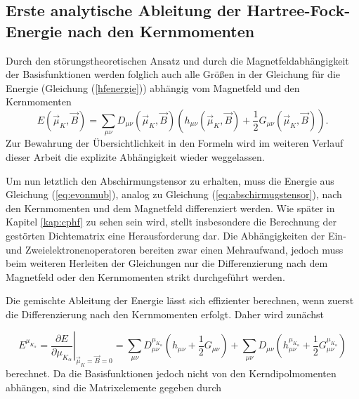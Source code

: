 \subsection{Erste analytische Ableitung der Hartree-Fock-Energie nach den Kernmomenten}

  	Durch den störungstheoretischen Ansatz und durch die Magnetfeldabhängigkeit der Basisfunktionen werden folglich auch alle Größen in der Gleichung für die Energie (Gleichung (\ref{hfenergie})) abhängig vom Magnetfeld und den Kernmomenten
  	\begin{equation}\label{eq:evonmub}
  	  E(\vec{\mu}_K,\vec{B})=\sum_{\mu\nu}D_{\mu\nu}(\vec{\mu}_K,\vec{B})(h_{\mu\nu}(\vec{\mu}_K,\vec{B})+\frac{1}{2}G_{\mu\nu}(\vec{\mu}_K,\vec{B})).
	\end{equation}  	 
  	\textcolor{myred}{Zur Bewahrung der Übersichtlichkeit in den Formeln wird im weiteren Verlauf dieser Arbeit die explizite Abhängigkeit wieder weggelassen.}
  	
  	Um nun letztlich den Abschirmungstensor zu erhalten, muss die Energie aus Gleichung (\ref{eq:evonmub}), analog zu Gleichung (\ref{eq:abschirmugstensor}), nach den Kernmomenten und dem Magnetfeld differenziert werden. Wie später in Kapitel \ref{kap:cphf} zu sehen sein wird, stellt insbesondere die Berechnung der gestörten Dichtematrix eine Herausforderung dar. Die Abhängigkeiten der Ein- und Zweielektronenoperatoren bereiten zwar einen Mehraufwand, jedoch muss beim weiteren Herleiten der Gleichungen nur die Differenzierung nach dem Magnetfeld oder den Kernmomenten strikt durchgeführt werden.
  	 
  	Die gemischte Ableitung der Energie lässt sich effizienter berechnen, wenn zuerst die Differenzierung nach den Kernmomenten erfolgt\supercite{baron1991}. Daher wird zunächst
  	
  	\begin{equation}\label{eq:enachmu}
  	  E^{\mu_{K_\alpha}}=\left.\frac{\partial E}{\partial\mu_{K_\alpha}}\right|_{\vec{\mu}_K=\vec{B}=0}=\sum_{\mu\nu}D_{\mu\nu}^{\mu_{K_\alpha}}\left(h_{\mu\nu}+\frac{1}{2}G_{\mu\nu}\right)+\sum_{\mu\nu}D_{\mu\nu}\left(h_{\mu\nu}^{\mu_{K_\alpha}}+\frac{1}{2}G_{\mu\nu}^{\mu_{K_\alpha}}\right)
  	\end{equation}
     berechnet. Da die Basisfunktionen jedoch nicht von den Kerndipolmomenten abhängen, sind die Matrixelemente gegeben durch
     
